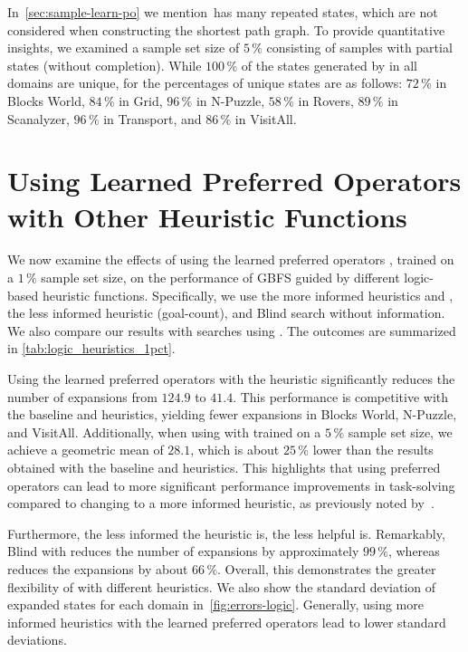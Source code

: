 \documentclass[ppgc,diss,english]{iiufrgs}
\newcommand{\ppi}[2][inline]{\todo[color=purple!50,linecolor={purple!100},#1,fancyline,author=Pedro]{#2}}
\begin{document}
In~\cref{sec:sample-learn-po} we mention~\bfsrw has many repeated states, which are not considered when constructing the shortest path graph. To provide quantitative insights, we examined a sample set size of $5\,\%$ consisting of samples with partial states (without completion). While $100\,\%$ of the states generated by \bfsrs in all domains are unique, for \bfsrw the percentages of unique states are as follows: $72\,\%$ in Blocks World, $84\,\%$ in Grid, $96\,\%$ in N-Puzzle, $58\,\%$ in Rovers, $89\,\%$ in Scanalyzer, $96\,\%$ in Transport, and $86\,\%$ in VisitAll.



\section{Using Learned Preferred Operators with Other Heuristic Functions}
\label{sec:other-heuristic-functions}
\ppi{Talk about that phenomenon.}
We now examine the effects of using the learned preferred operators \pog, trained on a $1\,\%$ sample set size, on the performance of GBFS guided by different logic-based heuristic functions. Specifically, we use the more informed heuristics \hff and \hadd, the less informed heuristic \hgc (goal-count), and Blind search without information. We also compare our results with searches using \poff. The outcomes are summarized in \cref{tab:logic_heuristics_1pct}.



Using the learned preferred operators \pog with the \hgc heuristic significantly reduces the number of expansions from $124.9$ to $41.4$. This performance is competitive with the baseline \hff and \hadd heuristics, yielding fewer expansions in Blocks World, N-Puzzle, and VisitAll. Additionally, when using \hgc with \pog trained on a $5\,\%$ sample set size, we achieve a geometric mean of $28.1$, which is about $25\,\%$ lower than the results obtained with the baseline \hff and \hadd heuristics. This highlights that using preferred operators can lead to more significant performance improvements in task-solving compared to changing to a more informed heuristic, as previously noted by~\citet{Correa.etal/2022}.

Furthermore, the less informed the heuristic is, the less helpful \poff is. Remarkably, Blind with \pog reduces the number of expansions by approximately $99\,\%$, whereas \poff reduces the expansions by about $66\,\%$. Overall, this demonstrates the greater flexibility of \pog with different heuristics. We also show the standard deviation of expanded states for each domain in~\cref{fig:errors-logic}. Generally, using more informed heuristics with the learned preferred operators lead to lower standard deviations.
\end{document}
